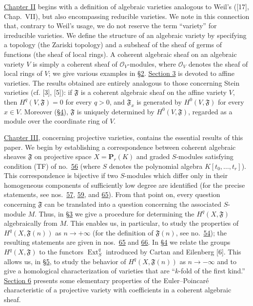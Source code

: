 \hyperref[fac:II]{Chapter II} begins with a definition of algebraic varieties analogous to Weil's ([17], Chap.~VII), but also encompassing reducible varieties. We note in this connection that, contrary to Weil's usage, we do not reserve the term ``variety'' for irreducible varieties. We define the structure of an algebraic variety by specifying a topology (the Zariski topology) and a subsheaf of the sheaf of germs of functions (the sheaf of local rings). A coherent algebraic sheaf on an algebraic variety $V$ is simply a coherent sheaf of $\mathcal{O}_V$-modules, where $\mathcal{O}_V$ denotes the sheaf of local rings of $V$; we give various examples in \hyperref[fac:II:2]{\S2}. \hyperref[fac:II:3]{Section 3} is devoted to affine varieties. The results obtained are entirely analogous to those concerning Stein varieties (cf. [3], [5]): if $\mathfrak{F}$ is a coherent algebraic sheaf on the affine variety $V$, then $H^q(V,\mathfrak{F})=0$ for every $q>0$, and $\mathfrak{F}_x$ is generated by $H^0(V,\mathfrak{F})$ for every $x\in V$. Moreover (\hyperref[fac:II:4]{\S4}), $\mathfrak{F}$ is uniquely determined by $H^0(V,\mathfrak{F})$, regarded as a module over the coordinate ring of $V$.

\hyperref[fac:III]{Chapter III}, concerning projective varieties, contains the essential results of this paper. We begin by establishing a correspondence between coherent algebraic sheaves $\mathfrak{F}$ on projective space $X=\mathbf{P}_r(K)$ and graded $S$-modules satisfying condition (TF) of no.~\hyperref[fac:III:2:no:56]{56} (where $S$ denotes the polynomial algebra $K[t_0,\ldots,t_r]$). This correspondence is bijective if two $S$-modules which differ only in their homogeneous components of sufficiently low degree are identified (for the precise statements, see nos.~\hyperref[fac:III:2:no:57]{57}, \hyperref[fac:III:2:no:59]{59}, and \hyperref[fac:III:3:no:65]{65}). From that point on, every question concerning $\mathfrak{F}$ can be translated into a question concerning the associated $S$-module $M$. Thus, in \hyperref[fac:III:3]{\S3} we give a procedure for determining the $H^q(X,\mathfrak{F})$ algebraically from $M$. This enables us, in particular, to study the properties of $H^q(X,\mathfrak{F}(n))$ as $n\to+\infty$ (for the definition of $\mathfrak{F}(n)$, see no.~\hyperref[fac:III:2:no:54]{54}); the resulting statements are given in nos.~\hyperref[fac:III:3:no:65]{65} and \hyperref[fac:III:3:no:66]{66}. In \hyperref[fac:III:4]{\S4} we relate the groups $H^q(X,\mathfrak{F})$ to the functors $\operatorname{Ext}^q_S$ introduced by Cartan and Eilenberg [6]. This allows us, in \hyperref[fac:III:5]{\S5}, to study the behavior of $H^q(X,\mathfrak{F}(n))$ as $n\to-\infty$ and to give a homological characterization of varieties that are ``$k$-fold of the first kind.'' \hyperref[fac:III:6]{Section 6} presents some elementary properties of the Euler--Poincar\'e characteristic of a projective variety with coefficients in a coherent algebraic sheaf.

